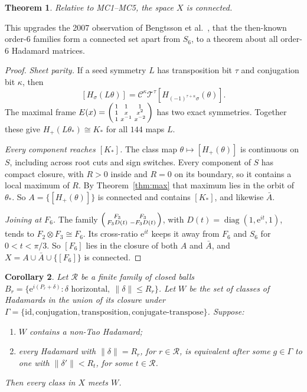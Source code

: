\documentclass[11pt]{article}
\newtheorem{theorem}{Theorem}
\newtheorem{corollary}[theorem]{Corollary}
\theoremstyle{remark}
\newcommand{\e}{\mathrm e}
\begin{document}
\begin{theorem}\label{thm:conn}
Relative to MC1--MC5, the space $X$ is connected.
\end{theorem}
\noindent This upgrades the 2007 observation of Bengtsson et al.\ \cite{BBELTZ}, that the then-known order-6 families form a connected set apart from $S_6$, to a theorem about all order-6 Hadamard matrices.

\begin{proof}
\emph{Sheet parity.} If a seed symmetry $L$ has transposition bit $\tau$ and conjugation bit $\kappa$, then
\[
 [H_\sigma(L\theta)]=\mathcal C^\kappa\mathcal T^\tau[H_{(-1)^{\tau+\kappa}\sigma}(\theta)].
\]
The maximal frame $E(x)=\begin{psmallmatrix}1&1&1\\1&x&x^2\\1&x^{-1}&x^{-2}\end{psmallmatrix}$ has two exact symmetries. Together these give $H_+(L\theta_*)\cong K_*$ for all $144$ maps $L$.

\emph{Every component reaches $[K_*]$.} The class map $\theta\mapsto[H_+(\theta)]$ is continuous on $S$, including across root cuts and sign switches. Every component of $S$ has compact closure, with $R>0$ inside and $R=0$ on its boundary, so it contains a local maximum of $R$. By Theorem~\ref{thm:max} that maximum lies in the orbit of $\theta_*$. So $A=\{[H_+(\theta)]\}$ is connected and contains $[K_*]$, and likewise $\bar A$.

\emph{Joining at $F_6$.} The family $\begin{psmallmatrix}F_3&F_3\\F_3D(t)&-F_3D(t)\end{psmallmatrix}$, with $D(t)=\operatorname{diag}(1,\e^{it},1)$, tends to $F_2\otimes F_3\cong F_6$. Its cross-ratio $\e^{it}$ keeps it away from $F_6$ and $S_6$ for $0<t<\pi/3$. So $[F_6]$ lies in the closure of both $A$ and $\bar A$, and $X=A\cup\bar A\cup\{[F_6]\}$ is connected.
\end{proof}

\begin{corollary}\label{cor:cover}
Let $\mathcal R$ be a finite family of closed balls $B_r=\{\e^{i(P_r+\delta)}:\delta \text{ horizontal},\ \|\delta\|\le R_r\}$. Let $W$ be the set of classes of Hadamards in the union of its closure under $\Gamma=\{\mathrm{id},\text{conjugation},\text{transposition},\text{conjugate-transpose}\}$. Suppose:
\begin{enumerate}
\item $W$ contains a non-Tao Hadamard;
\item every Hadamard with $\|\delta\|=R_r$, for $r\in\mathcal R$, is equivalent after some $g\in\Gamma$ to one with $\|\delta'\|<R_t$, for some $t\in\mathcal R$.
\end{enumerate}
Then every class in $X$ meets $W$.
\end{corollary}
\end{document}
